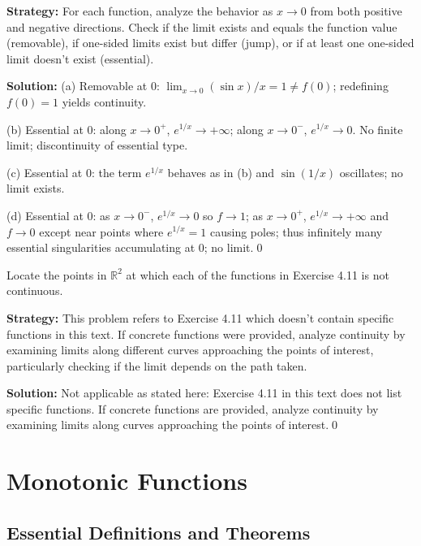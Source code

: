 \noindent\textbf{Strategy:} For each function, analyze the behavior as $x \to 0$ from both positive and negative directions. Check if the limit exists and equals the function value (removable), if one-sided limits exist but differ (jump), or if at least one one-sided limit doesn't exist (essential).

\bigskip\noindent\textbf{Solution:}
(a) Removable at $0$: $\lim_{x\to0}(\sin x)/x=1\ne f(0)$; redefining $f(0)=1$ yields continuity.

(b) Essential at $0$: along $x\to 0^+$, $e^{1/x}\to+\infty$; along $x\to0^-$, $e^{1/x}\to 0$. No finite limit; discontinuity of essential type.

(c) Essential at $0$: the term $e^{1/x}$ behaves as in (b) and $\sin(1/x)$ oscillates; no limit exists.

(d) Essential at $0$: as $x\to0^-$, $e^{1/x}\to0$ so $f\to 1$; as $x\to0^+$, $e^{1/x}\to+\infty$ and $f\to 0$ except near points where $e^{1/x}=1$ causing poles; thus infinitely many essential singularities accumulating at $0$; no limit.\qed



\begin{problembox}
Locate the points in $\mathbb{R}^2$ at which each of the functions in Exercise 4.11 is not continuous.
\end{problembox}

\noindent\textbf{Strategy:} This problem refers to Exercise 4.11 which doesn't contain specific functions in this text. If concrete functions were provided, analyze continuity by examining limits along different curves approaching the points of interest, particularly checking if the limit depends on the path taken.

\bigskip\noindent\textbf{Solution:}
Not applicable as stated here: Exercise 4.11 in this text does not list specific functions. If concrete functions are provided, analyze continuity by examining limits along curves approaching the points of interest.\qed

\section{Monotonic Functions}

\subsection*{Essential Definitions and Theorems}


